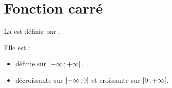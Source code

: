 \documentclass[12pt,a4paper]{article}
\begin{document}
%	
%		
%		
%		
%		
%		
%		
%
%		
%		
%		
%		
\section{Fonction carré}
	
	\begin{mybilan}
		La  est définie par .
		
		Elle est :
		\begin{itemize}
			\item définie sur $\mbox{\ensuremath{\left]- \infty \mathpunct{};+ \infty\right[}}$.
			\item décroissante sur $\mbox{\ensuremath{\left]- \infty\mathpunct{};0\right]}}$ et croissante sur $\mbox{\ensuremath{\left[0\mathpunct{};+ \infty\right[}}$.
		\end{itemize}
	\end{mybilan}
	
\end{document}
